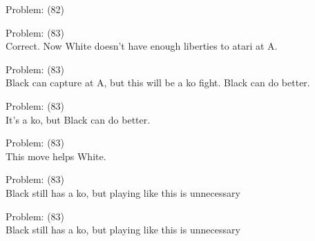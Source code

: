 \documentclass[11pt]{article}
\begin{document}
\begin{minipage}[t]{0.5\textwidth}
  {\centering
  
  Problem: (82)\\
  
  }
\end{minipage}
\begin{minipage}[t]{0.5\textwidth}
  {\centering
  
  Problem: (83)\\
  Correct. Now White doesn't have enough liberties to atari at A.\\
  }
\end{minipage}
\begin{minipage}[t]{0.5\textwidth}
  {\centering
  
  Problem: (83)\\
  Black can capture at A, but this will be a ko fight. Black can do better.\\
  }
\end{minipage}
\begin{minipage}[t]{0.5\textwidth}
  {\centering
  
  Problem: (83)\\
  It's a ko, but Black can do better.\\
  }
\end{minipage}
\begin{minipage}[t]{0.5\textwidth}
  {\centering
  
  Problem: (83)\\
  This move helps White.\\
  }
\end{minipage}
\begin{minipage}[t]{0.5\textwidth}
  {\centering
  
  Problem: (83)\\
  Black still has a ko, but playing like this is unnecessary\\
  }
\end{minipage}
\begin{minipage}[t]{0.5\textwidth}
  {\centering
  
  Problem: (83)\\
  Black still has a ko, but playing like this is unnecessary\\
  }
\end{minipage}
\end{document}
